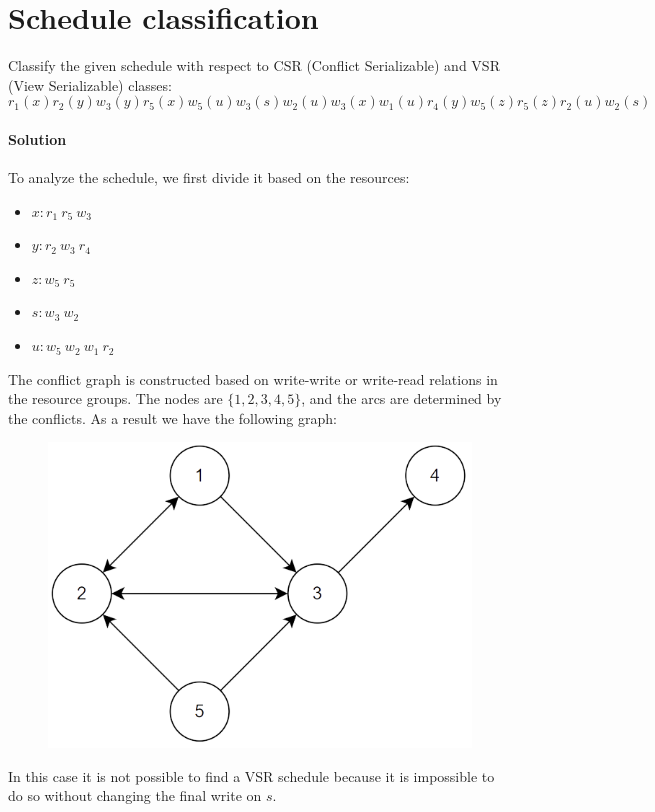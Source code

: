 \section{Schedule classification}

Classify the given schedule with respect to CSR (Conflict Serializable) and VSR (View Serializable) classes:
\[r_1(x) r_2(y) w_3(y) r_5(x) w_5(u) w_3(s)w_2(u) w_3(x) w_1(u) r_4(y) w_5(z) r_5(z) r_2(u) w_2(s)\]

\paragraph*{Solution}
To analyze the schedule, we first divide it based on the resources:
\begin{itemize}
    \item $x: r_1 \: r_5 \: w_3$
    \item $y: r_2 \: w_3 \: r_4$
    \item $z: w_5 \: r_5$
    \item $s: w_3 \: w_2$
    \item $u: w_5 \: w_2 \: w_1 \: r_2$
\end{itemize}
The conflict graph is constructed based on write-write or write-read relations in the resource groups. 
The nodes are $\{1,2,3,4,5\}$, and the arcs are determined by the conflicts. 
As a result we have the following graph:
\begin{figure}[H]
    \centering
    \includegraphics[width=0.5\linewidth]{images/conflictgraph2.png}
\end{figure}
In this case it is not possible to find a VSR schedule because it is impossible to do so without changing the final write on $s$. 